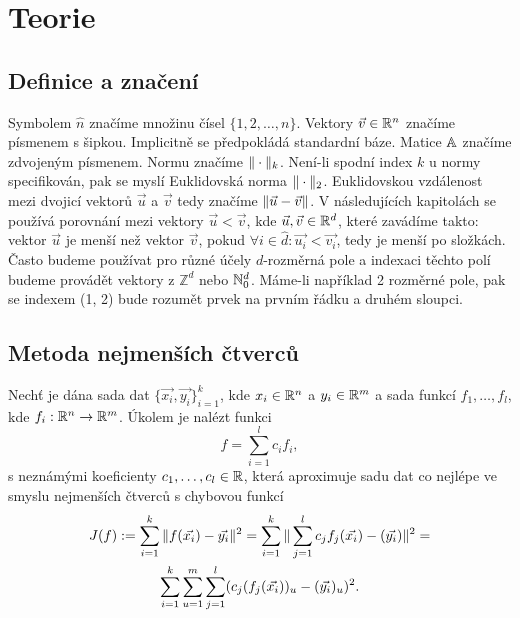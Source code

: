 \chapter{Teorie}

\section{Definice a značení}

Symbolem $\hat n$ značíme množinu čísel $\{1, 2, \ldots, n\}$. Vektory $\vec{v} \in \mathbb{R}^n$ značíme písmenem s šipkou. Implicitně se předpokládá standardní báze. Matice $\mathbb{A}$ značíme zdvojeným písmenem. Normu značíme $\|\cdot\|_k$. Není-li spodní index $k$ u normy specifikován, pak se myslí Euklidovská norma $\|\cdot\|_2$. Euklidovskou vzdálenost mezi dvojicí vektorů $\vec{u}$ a $\vec{v}$ tedy značíme $\|\vec{u} - \vec{v}\|$. V následujících kapitolách se používá porovnání mezi vektory $\vec{u} < \vec{v}$, kde $\vec{u}, \vec{v} \in \mathbb{R}^d$, které zavádíme takto: vektor $\vec{u}$ je menší než vektor $\vec{v}$, pokud $\forall i \in \hat{d}: \vec{u_i} < \vec{v_i}$, tedy je menší po složkách. Často budeme používat pro různé účely $d$-rozměrná pole a indexaci těchto polí budeme provádět vektory z $\mathbb{Z}^d$ nebo $\mathbb{N}_0^d$. Máme-li například 2 rozměrné pole, pak se indexem (1, 2) bude rozumět prvek na prvním řádku a druhém sloupci.

\section{Metoda nejmenších čtverců}

Nechť je dána sada dat $\{\vec{x_i}, \vec{y_i}\}_{i = 1}^k$, kde $x_i \in \mathbb{R}^n$ a $y_i \in \mathbb{R}^m$ a sada funkcí $f_1,\ldots,f_l$, kde $f_i: \mathbb{R}^n \rightarrow \mathbb{R}^m$. Úkolem je nalézt funkci
\[
  f = \sum_{i=1}^l c_if_i,
\]
s neznámými koeficienty $c_1,\ldots,c_l \in \mathbb{R}$, která aproximuje sadu dat co nejlépe ve smyslu nejmenších čtverců s chybovou funkcí
\begin{multline}
\label{defi:ls-min}
  J(f) := \sum_{i=1}^k \|f(\vec{x_i}) - \vec{y_i}\|^2 =
  \sum_{i=1}^k\|\sum_{j=1}^l c_jf_j(\vec{x_i}) - (\vec{y_i})\|^2 =\\
  \sum_{i=1}^k\sum_{u=1}^m\sum_{j=1}^l (c_j(f_j(\vec{x_i}))_u - (\vec{y_i})_u)^2.\\
\end{multline}

